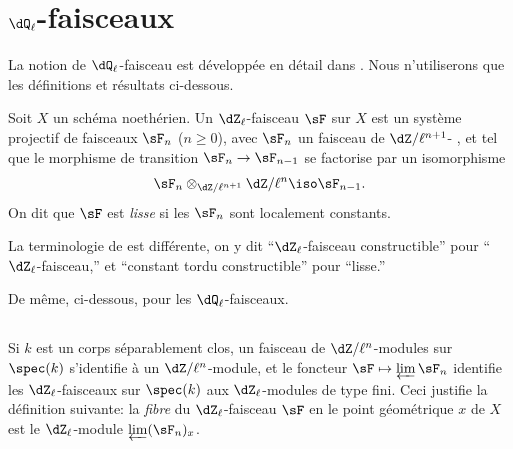 \section{\texorpdfstring{$\dQ_\ell$}{Ql}-faisceaux}\label{II:2}

La notion de $\dQ_\ell$-faisceau est développée en détail dans 
. Nous n'utiliserons que les définitions et résultats 
ci-dessous. 





\begin{definition_}\label{II:2-1}
Soit $X$ un schéma noethérien. Un $\dZ_\ell$-faisceau $\sF$ sur $X$ est un 
système projectif de faisceaux $\sF_n$ ($n\geqslant 0$), avec $\sF_n$ un 
faisceau de $\dZ/\ell^{n+1}$- , et tel que 
le morphisme de transition $\sF_n\to\sF_{n-1}$ se factorise par un isomorphisme 
\[
  \sF_n\otimes_{\dZ/\ell^{n+1}} \dZ/\ell^n \iso \sF_{n-1}\text{.}
\]
On dit que $\sF$ est \emph{lisse} si les $\sF_n$ sont localement constants. 
\end{definition_}

La terminologie de  est différente, on y dit ``$\dZ_\ell$-faisceau 
constructible'' pour ``$\dZ_\ell$-faisceau,'' et ``constant tordu 
constructible'' pour ``lisse.'' 

De même, ci-dessous, pour les $\dQ_\ell$-faisceaux. 





\subsection{}\label{II:2-2}

Si $k$ est un corps séparablement clos, un faisceau de $\dZ/\ell^n$-modules 
sur $\spec(k)$ s'identifie à un $\dZ/\ell^n$-module, et le foncteur 
$\sF\mapsto \varprojlim \sF_n$ identifie les $\dZ_\ell$-faisceaux sur 
$\spec(k)$ aux $\dZ_\ell$-modules de type fini. Ceci justifie la définition 
suivante: la \emph{fibre} du $\dZ_\ell$-faisceau $\sF$ en le point 
géométrique $x$ de $X$ est le $\dZ_\ell$-module $\varprojlim (\sF_n)_x$. 





\subsection{}\label{II:2-3}

